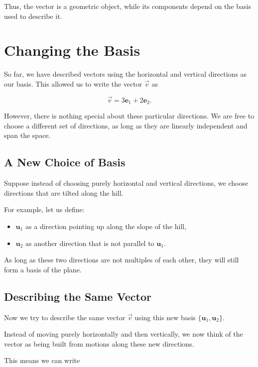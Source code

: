 \documentclass[11pt,openany]{book}
\theoremstyle{definition}
\begin{document}
\medskip

Thus, the vector is a geometric object, while its components depend on the basis used to describe it.


\section{Changing the Basis}

So far, we have described vectors using the horizontal and vertical directions as our basis. 
This allowed us to write the vector $\vec{v}$ as

\[
\vec{v} = 3\mathbf{e}_1 + 2\mathbf{e}_2.
\]

However, there is nothing special about these particular directions. 
We are free to choose a different set of directions, as long as they are linearly independent and span the space.

\subsection{A New Choice of Basis}

Suppose instead of choosing purely horizontal and vertical directions, 
we choose directions that are tilted along the hill.

For example, let us define:

\begin{itemize}
  \item $\mathbf{u}_1$ as a direction pointing up along the slope of the hill,
  \item $\mathbf{u}_2$ as another direction that is not parallel to $\mathbf{u}_1$.
\end{itemize}

As long as these two directions are not multiples of each other, they will still form a basis of the plane.

\medskip

\subsection{Describing the Same Vector}

Now we try to describe the same vector $\vec{v}$ using this new basis $\{\mathbf{u}_1, \mathbf{u}_2\}$.

Instead of moving purely horizontally and then vertically, 
we now think of the vector as being built from motions along these new directions.

This means we can write
\end{document}

